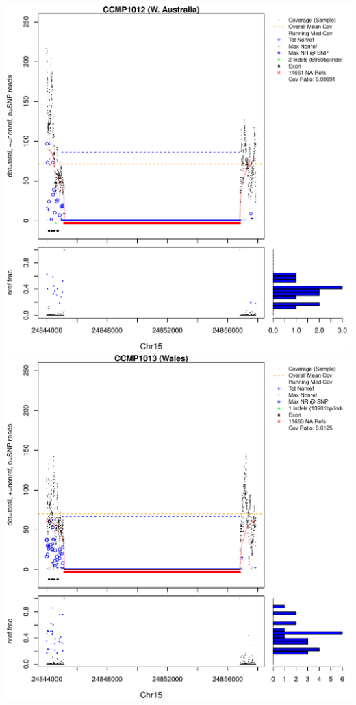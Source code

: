 \documentclass{article}\usepackage[]{graphicx}\usepackage[]{color}
\makeatletter
\def\maxwidth{ %
  \ifdim\Gin@nat@width>\linewidth
    \linewidth
  \else
    \Gin@nat@width
  \fi
}
\newenvironment{knitrout}{}{} %
\makeatother
\begin{document}
\begin{knitrout}
{\includegraphics[width=\maxwidth]{figs-knitr/unnamed-chunk-57-3} 
\includegraphics[width=\maxwidth]{figs-knitr/unnamed-chunk-57-4} 
}
\end{knitrout}
\end{document}
